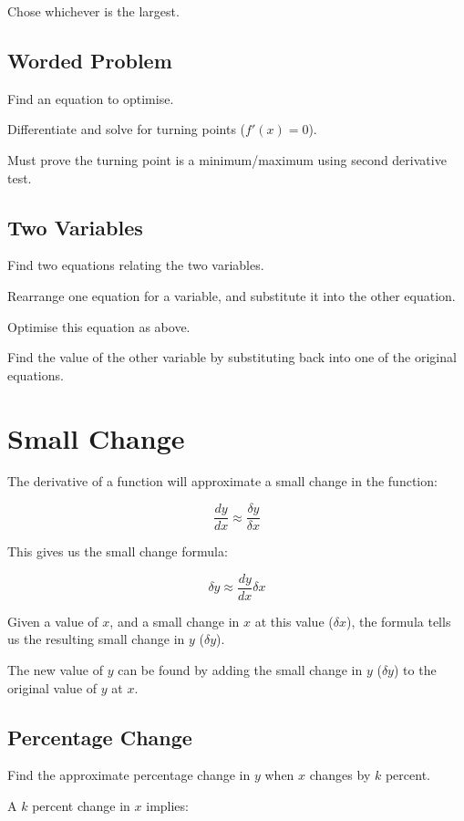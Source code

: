 \documentclass[a4paper,11pt]{article}
\begin{document}
Chose whichever is the largest.


\subsection{Worded Problem}

Find an equation to optimise.

Differentiate and solve for turning points ($f'(x) = 0$).

Must prove the turning point is a minimum/maximum using second derivative test.


\subsection{Two Variables}

Find two equations relating the two variables.

Rearrange one equation for a variable, and substitute it into the other
equation.

Optimise this equation as above.

Find the value of the other variable by substituting back into one of the
original equations.




\section{Small Change}

The derivative of a function will approximate a small change in the function:

$$
\frac{dy}{dx} \approx \frac{\delta y}{\delta x}
$$

This gives us the small change formula:

$$
\delta y \approx \frac{dy}{dx} \delta x
$$

Given a value of $x$, and a small change in $x$ at this value ($\delta x$), the
formula tells us the resulting small change in $y$ ($\delta y$).

The new value of $y$ can be found by adding the small change in $y$
($\delta y$) to the original value of $y$ at $x$.


\subsection{Percentage Change}

Find the approximate percentage change in $y$ when $x$ changes by $k$ percent.

A $k$ percent change in $x$ implies:
\end{document}
